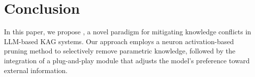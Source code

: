 \section{Conclusion}
In this paper, we propose \method{}, a novel paradigm for mitigating knowledge conflicts in LLM-based KAG systems. Our approach employs a neuron activation-based pruning method to selectively remove parametric knowledge, followed by the integration of a plug-and-play module that adjusts the model’s preference toward external information. 


